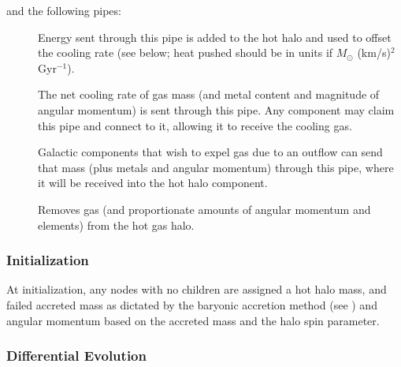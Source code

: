 and the following pipes:
\begin{description}
 \item [] Energy sent through this pipe is added to the hot halo and used to offset the cooling rate (see below; heat pushed should be in units if $M_\odot$ (km/s)$^2$ Gyr$^{-1}$).
 \item [] The net cooling rate of gas mass (and metal content and magnitude of angular momentum) is sent through this pipe. Any \gls{component} may claim this pipe and connect to it, allowing it to receive the cooling gas.
 \item [] Galactic components that wish to expel gas due to an outflow can send that mass (plus metals and angular momentum) through this pipe, where it will be received into the hot halo component. 
 \item [] Removes gas (and proportionate amounts of angular momentum and elements) from the hot gas halo.
\end{description}

\subsubsection{Initialization}

At initialization, any nodes with no children are assigned a hot halo mass, and failed accreted mass as dictated by the baryonic accretion method (see ) and angular momentum based on the accreted mass and the halo spin parameter.

\subsubsection{Differential Evolution}

